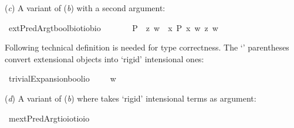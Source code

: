 \begin{isabellebody}
\begin{isamarkuptext}%
(\emph{c}) A variant of (\emph{b}) with a second argument:%
\end{isamarkuptext}\isamarkuptrue%
\isamarkupfalse%
\ extPredArg{}{\isacharcolon}{\isacharcolon}{\isachardoublequoteopen}{\isacharparenleft}{\isacharparenleft}{\isacharprime}t{\isasymRightarrow}bool{\isacharparenright}{\isasymRightarrow}{\isacharprime}b{\isasymRightarrow}io{\isacharparenright}{\isasymRightarrow}{\isacharparenleft}{\isacharprime}t{\isasymRightarrow}io{\isacharparenright}{\isasymRightarrow}{\isacharprime}b{\isasymRightarrow}io{\isachardoublequoteclose}\ {\isacharparenleft}\ {\isachardoublequoteopen}{\isasymdown}\ {}{}{\isacharparenright}\isanewline
\ \ \ {\isachardoublequoteopen}{\isasymphi}\ {\isasymdown}P\ {\isasymequiv}\ {\isasymlambda}z{\isachardot}\ {\isasymlambda}w{\isachardot}\ {\isasymphi}\ {\isacharparenleft}{\isasymlambda}x{\isachardot}\ P\ x\ w{\isacharparenright}\ z\ w{\isachardoublequoteclose}%
\begin{isamarkuptext}%
Following technical definition is needed for type correctness. The `\isa{{\isasymlparr}{\isacharunderscore}{\isasymrparr}}' parentheses convert
 extensional objects into `rigid' intensional ones:%
\end{isamarkuptext}\isamarkuptrue%
\isamarkupfalse%
\ trivialExpansion{\isacharcolon}{\isacharcolon}{\isachardoublequoteopen}bool{\isasymRightarrow}io{\isachardoublequoteclose}\ {\isacharparenleft}{\isachardoublequoteopen}{\isasymlparr}{\isacharunderscore}{\isasymrparr}{\isachardoublequoteclose}{\isacharparenright}\ \ {\isachardoublequoteopen}{\isasymlparr}{\isasymphi}{\isasymrparr}\ {\isasymequiv}\ {\isacharparenleft}{\isasymlambda}w{\isachardot}\ {\isasymphi}{\isacharparenright}{\isachardoublequoteclose}%
\begin{isamarkuptext}%
(\emph{d}) A variant of (\emph{b}) where \isa{{\isasymphi}} takes `rigid' intensional terms as argument:%
\end{isamarkuptext}\isamarkuptrue%
\isamarkupfalse%
\ mextPredArg{\isacharcolon}{\isacharcolon}{\isachardoublequoteopen}{\isacharparenleft}{\isacharparenleft}{\isacharprime}t{\isasymRightarrow}io{\isacharparenright}{\isasymRightarrow}io{\isacharparenright}{\isasymRightarrow}{\isacharparenleft}{\isacharprime}t{\isasymRightarrow}io{\isacharparenright}{\isasymRightarrow}io{\isachardoublequoteclose}\ {\isacharparenleft}\ {\isachardoublequoteopen}\isactrlbold {\isasymdown}{\isachardoublequoteclose}\ {}{}{\isacharparenright}\isanewline

\end{isabellebody}
